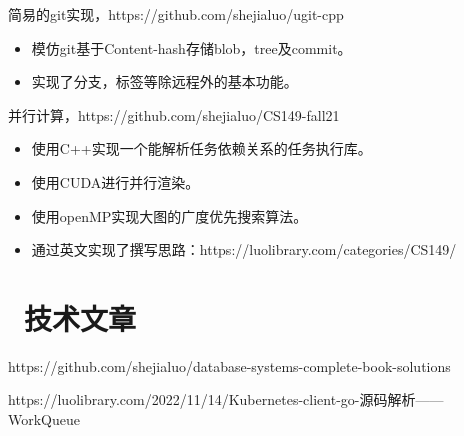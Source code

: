 \documentclass{resume}
\begin{document}
\begin{onehalfspacing}
简易的git实现，https://github.com/shejialuo/ugit-cpp
\begin{itemize}
  \item 模仿git基于Content-hash存储blob，tree及commit。
  \item 实现了分支，标签等除远程外的基本功能。
\end{itemize}
\end{onehalfspacing}

\begin{onehalfspacing}
并行计算，https://github.com/shejialuo/CS149-fall21
\begin{itemize}
  \item 使用C++实现一个能解析任务依赖关系的任务执行库。
  \item 使用CUDA进行并行渲染。
  \item 使用openMP实现大图的广度优先搜索算法。
  \item 通过英文实现了撰写思路：https://luolibrary.com/categories/CS149/
\end{itemize}
\end{onehalfspacing}


\section{\faBook\ 技术文章}

\begin{onehalfspacing}
https://github.com/shejialuo/database-systems-complete-book-solutions
\end{onehalfspacing}

\begin{onehalfspacing}
https://luolibrary.com/2022/11/14/Kubernetes-client-go-源码解析——WorkQueue
\end{onehalfspacing}
\end{document}
